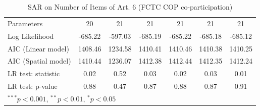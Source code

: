 \begin{table}[!h]
\begin{center}
\begin{tabular}{l c c c c c c }
Parameters              & 20           & 21           & 21           & 21           & 21           & 21           \\
Log Likelihood          & -685.22      & -597.03      & -685.19      & -685.22      & -685.18      & -685.12      \\
AIC (Linear model)      & 1408.46      & 1234.58      & 1410.41      & 1410.46      & 1410.38      & 1410.25      \\
AIC (Spatial model)     & 1410.44      & 1236.07      & 1412.38      & 1412.44      & 1412.35      & 1412.24      \\
LR test: statistic      & 0.02         & 0.52         & 0.03         & 0.02         & 0.03         & 0.01         \\
LR test: p-value        & 0.88         & 0.47         & 0.87         & 0.88         & 0.87         & 0.91         \\
\bottomrule
\multicolumn{7}{l}{\scriptsize{$^{***}p<0.001$, $^{**}p<0.01$, $^*p<0.05$}}
\end{tabular}
\caption{SAR on Number of Items of Art. 6 (FCTC COP co-participation)}
\label{table:coefficients}
\end{center}
\end{table}
